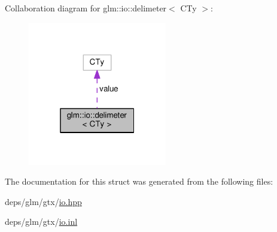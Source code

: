 Collaboration diagram for glm\+:\+:io\+:\+:delimeter$<$ C\+Ty $>$\+:
\nopagebreak
\begin{figure}[H]
\begin{center}
\leavevmode
\includegraphics[width=172pt]{de/d16/structglm_1_1io_1_1delimeter__coll__graph}
\end{center}
\end{figure}


The documentation for this struct was generated from the following files\+:\begin{DoxyCompactItemize}
\item 
deps/glm/gtx/\hyperlink{io_8hpp}{io.\+hpp}\item 
deps/glm/gtx/\hyperlink{io_8inl}{io.\+inl}\end{DoxyCompactItemize}
